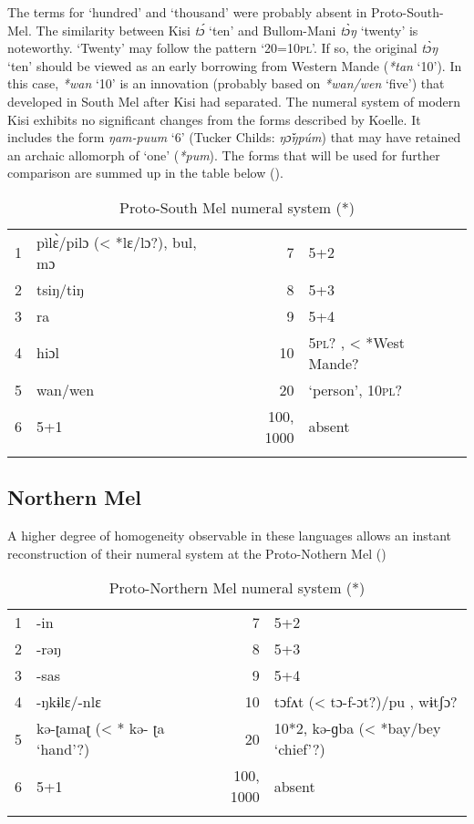 The terms for ‘hundred’ and ‘thousand’ were probably absent in Proto-South-Mel. The similarity between Kisi \textit{t{\'{ɔ}}} ‘ten’ and Bullom-Mani \textit{t{\`{ɔ}}ŋ} ‘twenty’ is noteworthy. ‘Twenty’ may follow the pattern ‘20=10\textsc{pl}’. If so, the original \textit{t{\`{ɔ}}ŋ} ‘ten’ should be viewed as an early borrowing from Western Mande (\textit{*tan} ‘10’). In this case, \textit{*wan} ‘10’ is an innovation (probably based on \textit{*wan/wen} ‘five’) that developed in South Mel after Kisi had separated.  The numeral system of modern Kisi exhibits no significant changes from the forms described by Koelle. It includes the form \textit{ŋam-puum} ‘6’ (Tucker Childs: \textit{ŋ{\v{ɔ}}ŋp{\'{u}}m}) that may have retained an archaic allomorph of ‘one’ (\textit{*pum}). The forms that will be used for further comparison are summed up in the table below ().

\begin{table}
\caption{\label{tab:3:217}Proto-South Mel numeral system (*)}


\begin{tabularx}{\textwidth}{lQrQ}
\lsptoprule

1 & pìl{\`{ɛ}}/pilɔ (< *lɛ/lɔ?), bul, mɔ & 7 & 5+2\\
2 & tsiŋ/tiŋ & 8 & 5+3\\
3 & ra & 9 & 5+4\\
4 & hiɔl & 10 & 5\textsc{pl}? , < *West Mande? \\
5 & wan/wen & 20 & ‘person’, 10\textsc{pl}? \\
6 & 5+1 &  {100,} 1000 & absent\\
\lspbottomrule
\end{tabularx}
\end{table}
  
 
\subsection{Northern Mel}%
A higher degree of homogeneity observable in these languages allows an instant reconstruction of their numeral system at the Proto-Nothern Mel ()

\begin{table}
\caption{\label{tab:3:218}Proto-Northern Mel numeral system (*)}


\begin{tabularx}{\textwidth}{lQrQ}
\lsptoprule

1 & -in & 7 & 5+2\\
2 & -rəŋ & 8 & 5+3\\
3 & -sas & 9 & 5+4\\
4 & -ŋkɨlɛ/-nlɛ & 10 & tɔfʌt (< tɔ-f-ɔt?)/pu , wɨtʃɔ? \\
5 & kə-ʈamaʈ (< * kə- ʈa ‘hand’?) & 20 & 10*2, kə-ɡba (< *bay/bey ‘chief’?)\\
6 & 5+1 & 100, 1000 & absent\\
\lspbottomrule
\end{tabularx}
\end{table}

